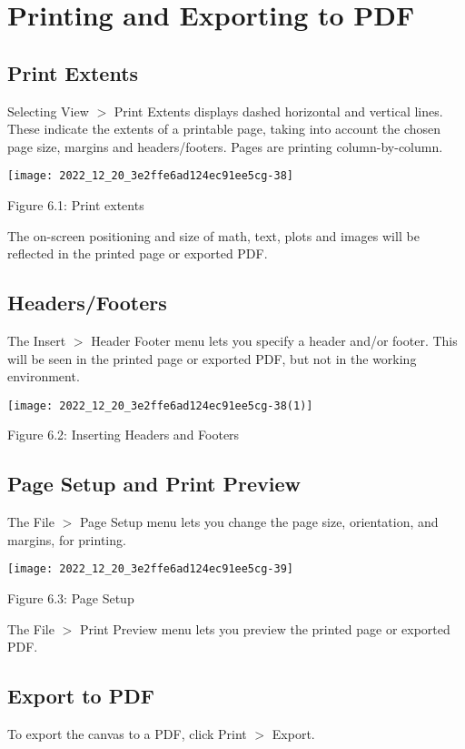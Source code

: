\section{Printing and Exporting to PDF}
\subsection{Print Extents}
Selecting View $>$ Print Extents displays dashed horizontal and vertical lines. These indicate the extents of a printable page, taking into account the chosen page size, margins and headers/footers. Pages are printing column-by-column.

\begin{center}
\texttt{[image: 2022\_12\_20\_3e2ffe6ad124ec91ee5cg-38]}
\end{center}

Figure 6.1: Print extents

The on-screen positioning and size of math, text, plots and images will be reflected in the printed page or exported PDF.

\subsection{Headers/Footers}
The Insert $>$ Header Footer menu lets you specify a header and/or footer. This will be seen in the printed page or exported PDF, but not in the working environment.

\begin{center}
\texttt{[image: 2022\_12\_20\_3e2ffe6ad124ec91ee5cg-38(1)]}
\end{center}

Figure 6.2: Inserting Headers and Footers

\subsection{Page Setup and Print Preview}
The File $>$ Page Setup menu lets you change the page size, orientation, and margins, for printing.

\begin{center}
\texttt{[image: 2022\_12\_20\_3e2ffe6ad124ec91ee5cg-39]}
\end{center}

Figure 6.3: Page Setup

The File $>$ Print Preview menu lets you preview the printed page or exported PDF.

\subsection{Export to PDF}
To export the canvas to a PDF, click Print $>$ Export.

